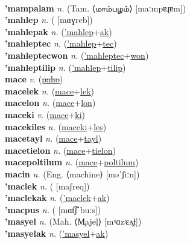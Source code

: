  \label{mamulak} \\
\textbf{'mampalam} \textit{n.} (Tam. ⟨மாம்பழம்⟩ [maːmpɐɻɐm])
 \label{'mampalam} \\
\textbf{'mahlep} \textit{n.} ( [mɑɣreb])
 \label{'mahlep} \\
\textbf{'mahlepak} \textit{n.} (\hyperref['mahlep]{'mahlep}+\hyperref[ak]{ak})
 \label{'mahlepak} \\
\textbf{'mahleptec} \textit{n.} (\hyperref['mahlep]{'mahlep}+\hyperref[tec]{tec})
 \label{'mahleptec} \\
\textbf{'mahleptecwon} \textit{n.} (\hyperref['mahleptec]{'mahleptec}+\hyperref[won]{won})
 \label{'mahleptecwon} \\
\textbf{'mahleptilip} \textit{n.} (\hyperref['mahlep]{'mahlep}+\hyperref[tilip]{tilip})
 \label{'mahleptilip} \\
\textbf{mace} \textit{v.} (\hyperref[paho]{\sout{paho}})
 \label{mace} \\
\textbf{macelek} \textit{n.} (\hyperref[mace]{mace}+\hyperref[lek]{lek})
 \label{macelek} \\
\textbf{macelon} \textit{n.} (\hyperref[mace]{mace}+\hyperref[lon]{lon})
 \label{macelon} \\
\textbf{maceki} \textit{v.} (\hyperref[mace]{mace}+\hyperref[ki]{ki})
 \label{maceki} \\
\textbf{macekiles} \textit{n.} (\hyperref[maceki]{maceki}+\hyperref[les]{les})
 \label{macekiles} \\
\textbf{macetayl} \textit{n.} (\hyperref[mace]{mace}+\hyperref[tayl]{tayl})
 \label{macetayl} \\
\textbf{macetielon} \textit{n.} (\hyperref[mace]{mace}+\hyperref[tielon]{tielon})
 \label{macetielon} \\
\textbf{macepoltilum} \textit{n.} (\hyperref[mace]{mace}+\hyperref[poltilum]{poltilum})
 \label{macepoltilum} \\
\textbf{macin} \textit{n.} (Eng. ⟨machine⟩ [məˈʃiːn])
 \label{macin} \\
\textbf{'maclek} \textit{n.} ( [maʃreq])
 \label{'maclek} \\
\textbf{'maclekak} \textit{n.} (\hyperref['maclek]{'maclek}+\hyperref[ak]{ak})
 \label{'maclekak} \\
\textbf{'macpus} \textit{n.} ( [mɑt͡ʃˈbuːs])
 \label{'macpus} \\
\textbf{'masyel} \textit{n.} (Mah. ⟨M̧ajeļ⟩ [mˠɑzʲɛʌ̯ɫ])
 \label{'masyel} \\
\textbf{'masyelak} \textit{n.} (\hyperref['masyel]{'masyel}+\hyperref[ak]{ak})
